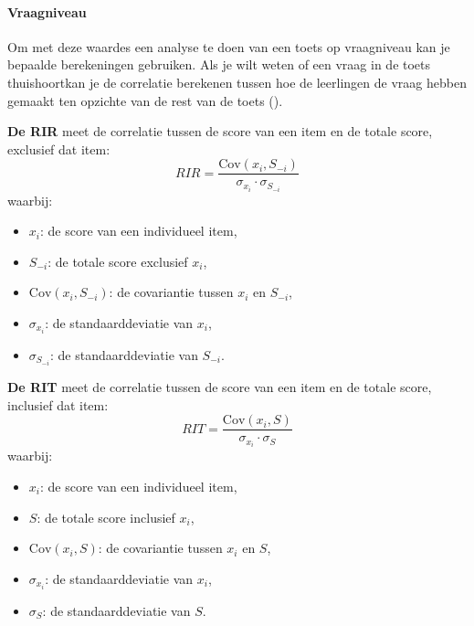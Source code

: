 \documentclass[12pt]{article}
\begin{document}
\pagebreak
\begin{multicols}{2}
\paragraph*{Vraagniveau} Om met deze waardes een analyse te doen van een toets op vraagniveau kan je bepaalde berekeningen gebruiken. Als je wilt weten of een vraag in de toets thuishoortkan je de correlatie berekenen tussen hoe de leerlingen de vraag hebben gemaakt ten opzichte van de rest van de toets (\cite{ding2013item, ding2009item}).
\begin{minipage}{\linewidth}%
\textbf{De RIR} meet de correlatie tussen de score van een item en de totale score, exclusief dat item:
\[
RIR = \frac{\text{Cov}(x_i, S_{-i})}{\sigma_{x_i} \cdot \sigma_{S_{-i}}}
\]
waarbij:
\begin{itemize}
    \item \(x_i\): de score van een individueel item,
    \item \(S_{-i}\): de totale score exclusief \(x_i\),
    \item \(\text{Cov}(x_i, S_{-i})\): de covariantie tussen \(x_i\) en \(S_{-i}\),
    \item \(\sigma_{x_i}\): de standaarddeviatie van \(x_i\),
    \item \(\sigma_{S_{-i}}\): de standaarddeviatie van \(S_{-i}\).
\end{itemize}
\end{minipage}
\begin{minipage}{\linewidth}%
\textbf{De RIT} meet de correlatie tussen de score van een item en de totale score, inclusief dat item:
\[
RIT = \frac{\text{Cov}(x_i, S)}{\sigma_{x_i} \cdot \sigma_{S}}
\]
waarbij:
\begin{itemize}
    \item \(x_i\): de score van een individueel item,
    \item \(S\): de totale score inclusief \(x_i\),
    \item \(\text{Cov}(x_i, S)\): de covariantie tussen \(x_i\) en \(S\),
    \item \(\sigma_{x_i}\): de standaarddeviatie van \(x_i\),
    \item \(\sigma_{S}\): de standaarddeviatie van \(S\).
\end{itemize}
\end{minipage}

\end{multicols}
\end{document}
